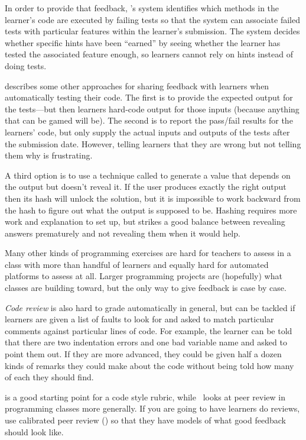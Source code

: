 In order to provide that feedback,
\cite{Buff2015}'s system identifies which methods in the learner's code
are executed by failing tests
so that the system can associate failed tests
with particular features within the learner's submission.
The system decides whether specific hints have been ``earned''
by seeing whether the learner has tested the associated feature enough,
so learners cannot rely on hints instead of doing tests.

\cite{Srid2016} describes some other approaches for sharing feedback with learners
when automatically testing their code.
The first is to provide the expected output for the tests---but
then learners hard-code output for those inputs
(because anything that can be gamed will be).
The second is to report the pass/fail results for the learners' code,
but only supply the actual inputs and outputs of the tests after the submission date.
However,
telling learners that they are wrong but not telling them why is frustrating.

A third option is to use a technique called 
to generate a value that depends on the output but doesn't reveal it.
If the user produces exactly the right output
then its hash will unlock the solution,
but it is impossible to work backward from the hash to figure out
what the output is supposed to be.
Hashing requires more work and explanation to set up,
but strikes a good balance between revealing answers prematurely
and not revealing them when it would help.


Many other kinds of programming exercises
are hard for teachers to assess in a class with more than handful of learners
and equally hard for automated platforms to assess at all.
Larger programming projects are (hopefully) what classes are building toward,
but the only way to give feedback is case by case.

\emph{Code review} is also hard to grade automatically in general,
but can be tackled if learners are given a list of faults to look for
and asked to match particular comments against particular lines of code.
For example,
the learner can be told that there are two indentation errors and one bad variable name
and asked to point them out.
If they are more advanced,
they could be given half a dozen kinds of remarks they could make about the code
without being told how many of each they should find.

\cite{Steg2016b} is a good starting point for a code style rubric,
while~\cite{Luxt2009} looks at peer review in programming classes more generally.
If you are going to have learners do reviews,
use calibrated peer review ()
so that they have models of what good feedback should look like.

